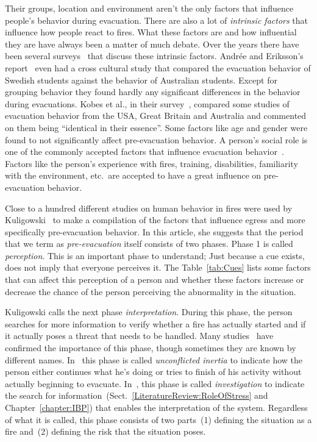 Their groups, location and environment aren't the only factors that influence people's behavior during evacuation. There are also a lot of \emph{intrinsic factors} that influence how people react to fires. What these factors are and how influential they are have always been a matter of much debate. Over the years there have been several surveys~\cite{Tong:1985wn,Sandberg:1997tw,Kuligowski:2009un} that discuss these intrinsic factors. Andr\'{e}e and Eriksson's report~\cite{Andree:2008td} even had a cross cultural study that compared the evacuation behavior of Swedish students against the behavior of Australian students. Except for grouping behavior they found hardly any significant differences in the behavior during evacuations. Kobes et al., in their survey~\cite{Kobes:2009jx}, compared some studies of evacuation behavior from the USA, Great Britain and Australia and commented on them being ``identical in their essence''. Some factors like age and gender were found to not significantly affect pre-evacuation behavior. A person's social role is one of the commonly accepted factors that influence evacuation behavior~\cite{Sandberg:1997tw,Kobes:2009jx,Paulsen:1984ti}. Factors like the person's experience with fires, training, disabilities, familiarity with the environment, etc.\ are accepted to have a great influence on pre-evacuation behavior.

Close to a hundred different studies on human behavior in fires were used by Kuligowski~\cite{Kuligowski:2009un} to make a compilation of the factors that influence egress and more specifically pre-evacuation behavior. In this article, she suggests that the period that we term as \emph{pre-evacuation} itself consists of two phases. Phase 1 is called \emph{perception}. This is an important phase to understand; Just because a cue exists, does not imply that everyone perceives it. The Table~\ref{tab:Cues} lists some factors that can affect this perception of a person and whether these factors increase or decrease the chance of the person perceiving the abnormality in the situation.

Kuligowski calls the next phase \emph{interpretation}. During this phase, the person searches for more information to verify whether a fire has actually started and if it actually poses a threat that needs to be handled. Many studies~\cite{Ozel:2001tn,Proulx:2007ul} have confirmed the importance of this phase, though sometimes they are known by different names. In~\cite{Ozel:2001tn} this phase is called \emph{unconflicted inertia} to indicate how the person either continues what he's doing or tries to finish of his activity without actually beginning to evacuate. In~\cite{Tong:1985wn}, this phase is called \emph{investigation} to indicate the search for information~(Sect.~\ref{LiteratureReview:RoleOfStress} and Chapter~\ref{chapter:IBP}) that enables the interpretation of the system. Regardless of what it is called, this phase consists of two parts~(1) defining the situation as a fire and~(2) defining the risk that the situation poses.

